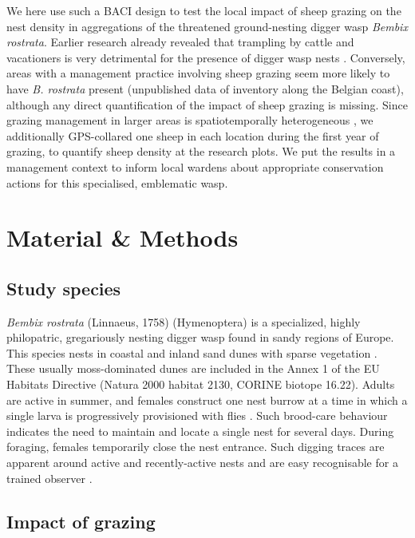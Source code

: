 \documentclass[10pt, twoside]{book} %
\begin{document}
	We here use such a BACI design to test the local impact of sheep grazing on the nest density in aggregations of the threatened ground-nesting digger wasp \textit{Bembix rostrata}. Earlier research already revealed that trampling by cattle and vacationers is very detrimental for the presence of digger wasp nests \citep{bonte2005}. Conversely, areas with a management practice involving sheep grazing seem more likely to have \textit{B. rostrata} present (unpublished data of inventory along the Belgian coast), although any direct quantification of the impact of sheep grazing is missing. Since grazing management in larger areas is spatiotemporally heterogeneous \citep{vanklink2015}, we additionally GPS-collared one sheep in each location during the first year of grazing, to quantify sheep density at the research plots. We put the results in a management context to inform local wardens about appropriate conservation actions for this specialised, emblematic wasp.\\
	\clearpage
	\section{Material \& Methods}
	\subsection{Study species}\label{3studyspecies}
	\textit{Bembix rostrata} (Linnaeus, 1758) (Hymenoptera) is a specialized, highly philopatric, gregariously nesting digger wasp found in sandy regions of Europe. This species nests in coastal and inland sand dunes with sparse vegetation \citep{larsson1986, klein2004}. These usually moss-dominated dunes are included in the Annex 1 of the EU Habitats Directive (Natura 2000 habitat 2130, CORINE biotope 16.22). Adults are active in summer, and females construct one nest burrow at a time in which a single larva is progressively provisioned with flies \citep{nielsen1945, field2005}. Such brood-care behaviour indicates the need to maintain and locate a single nest for several days. During foraging, females temporarily close the nest entrance. Such digging traces are apparent around active and recently-active nests and are easy recognisable for a trained observer \citep{evans2007}.\\
	
	\subsection{Impact of grazing}
\end{document}
